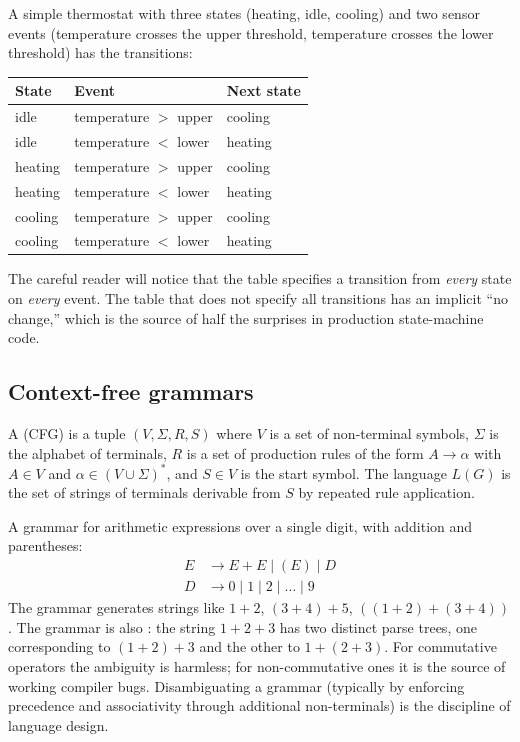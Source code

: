 \begin{example}
A simple thermostat with three states (heating, idle, cooling) and two sensor events (temperature crosses the upper threshold, temperature crosses the lower threshold) has the transitions:
\begin{center}
\begin{tabular}{lll}
\toprule
State & Event & Next state \\
\midrule
idle    & temperature $>$ upper & cooling \\
idle    & temperature $<$ lower & heating \\
heating & temperature $>$ upper & cooling \\
heating & temperature $<$ lower & heating \\
cooling & temperature $>$ upper & cooling \\
cooling & temperature $<$ lower & heating \\
\bottomrule
\end{tabular}
\end{center}
The careful reader will notice that the table specifies a transition from \emph{every} state on \emph{every} event. The table that does not specify all transitions has an implicit ``no change,'' which is the source of half the surprises in production state-machine code.
\end{example}

\subsection{Context-free grammars}

A  (CFG) is a tuple $(V, \Sigma, R, S)$ where $V$ is a set of non-terminal symbols, $\Sigma$ is the alphabet of terminals, $R$ is a set of production rules of the form $A \to \alpha$ with $A \in V$ and $\alpha \in (V \cup \Sigma)^*$, and $S \in V$ is the start symbol. The language $L(G)$ is the set of strings of terminals derivable from $S$ by repeated rule application.

A grammar for arithmetic expressions over a single digit, with addition and parentheses:
\begin{align*}
E &\to E + E \mid (E) \mid D \\
D &\to 0 \mid 1 \mid 2 \mid \ldots \mid 9
\end{align*}
The grammar generates strings like $1 + 2$, $(3 + 4) + 5$, $((1 + 2) + (3 + 4))$. The grammar is also : the string $1 + 2 + 3$ has two distinct parse trees, one corresponding to $(1 + 2) + 3$ and the other to $1 + (2 + 3)$. For commutative operators the ambiguity is harmless; for non-commutative ones it is the source of working compiler bugs. Disambiguating a grammar (typically by enforcing precedence and associativity through additional non-terminals) is the discipline of language design.

